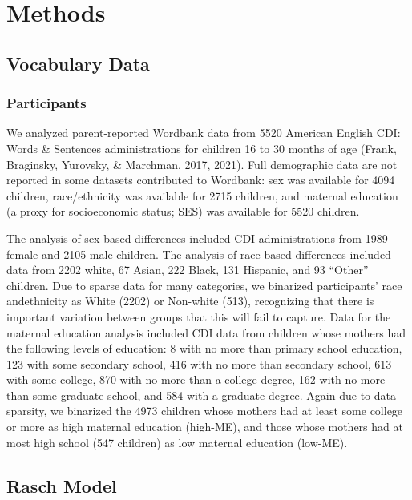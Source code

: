 \documentclass[10pt, letterpaper]{article}
\begin{document}
\hypertarget{methods}{%
\section{Methods}\label{methods}}

\hypertarget{vocabulary-data}{%
\subsection{Vocabulary Data}\label{vocabulary-data}}

\hypertarget{participants}{%
\subsubsection{Participants}\label{participants}}

We analyzed parent-reported Wordbank data from 5520 American English
CDI: Words \& Sentences administrations for children 16 to 30 months of
age (Frank, Braginsky, Yurovsky, \& Marchman, 2017, 2021). Full
demographic data are not reported in some datasets contributed to
Wordbank: sex was available for 4094 children, race/ethnicity was
available for 2715 children, and maternal education (a proxy for
socioeconomic status; SES) was available for 5520 children.

The analysis of sex-based differences included CDI administrations from
1989 female and 2105 male children. The analysis of race-based
differences included data from 2202 white, 67 Asian, 222 Black, 131
Hispanic, and 93 ``Other'' children. Due to sparse data for many
categories, we binarized participants' race andethnicity as White (2202)
or Non-white (513), recognizing that there is important variation
between groups that this will fail to capture. Data for the maternal
education analysis included CDI data from children whose mothers had the
following levels of education: 8 with no more than primary school
education, 123 with some secondary school, 416 with no more than
secondary school, 613 with some college, 870 with no more than a college
degree, 162 with no more than some graduate school, and 584 with a
graduate degree. Again due to data sparsity, we binarized the 4973
children whose mothers had at least some college or more as high
maternal education (high-ME), and those whose mothers had at most high
school (547 children) as low maternal education (low-ME).

\hypertarget{rasch-model}{%
\subsection{Rasch Model}\label{rasch-model}}
\end{document}
